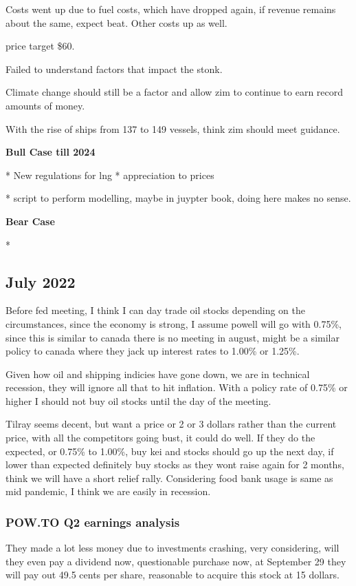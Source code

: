 Costs went up due to fuel costs, which have dropped again, if revenue remains about the same, expect beat. Other costs up as well.

price target \$60.

Failed to understand factors that impact the stonk.

Climate change should still be a factor and allow zim to continue to earn record amounts of money.

With the rise of ships from 137 to 149 vessels, think zim should meet guidance.

\textbf{Bull Case till 2024}

* New regulations for lng
* appreciation to prices

* script to perform modelling, maybe in juypter book, doing here makes no sense.

\textbf{Bear Case}

* 
\subsection{July 2022}

Before fed meeting, I think I can day trade oil stocks depending on the circumstances, since the economy is strong, I assume powell will go with 0.75\%, since this is similar to canada there is no meeting in august, might be a similar policy to canada where they jack up interest rates to 1.00\% or 1.25\%.

Given how oil and shipping indicies have gone down, we are in technical recession, they will ignore all that to hit inflation. With a policy rate of 0.75\% or higher I should not buy oil stocks until the day of the meeting.

Tilray seems decent, but want a price or 2 or 3 dollars rather than the current price, with all the competitors going bust, it could do well. If they do the expected, or 0.75\% to 1.00\%, buy kei and stocks should go up the next day, if lower than expected definitely buy stocks as they wont raise again for 2 months, think we will have a short relief rally. Considering food bank usage is same as mid pandemic, I think we are easily in recession.


\subsubsection{POW.TO Q2 earnings analysis}

They made a lot less money due to investments crashing, very considering, will they even pay a dividend now, questionable purchase now, at 	September 29 they will pay out 49.5 cents per share, reasonable to acquire this stock at 15 dollars.

